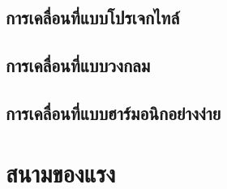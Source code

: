 \documentclass[a4paper,12pt]{book} %
\begin{document}
\section{การเคลื่อนที่แบบโปรเจกไทล์}
\begin{c3}\end{c3}

\vspace{1in}
\begin{c3}\end{c3}

\vspace{1in}
\newpage
\section{การเคลื่อนที่แบบวงกลม}
\begin{c3}\end{c3}

\vspace{1in}
\begin{c3}\end{c3}

\vspace{1in}
\begin{c3}\end{c3}

\vspace{1in}
\section{การเคลื่อนที่แบบฮาร์มอนิกอย่างง่าย}
\begin{c3}\end{c3}

\vfill
\begin{c3}\end{c3}

\vspace{1in}
\newpage
\chapter{สนามของแรง}
\begin{c3}\end{c3}

\end{document}
